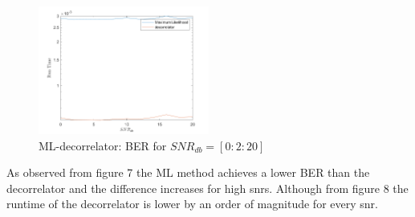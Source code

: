 \documentclass[12pt]{article}
\begin{document}
\begin{enumerate}
\begin{enumerate}
\begin{enumerate}
				\begin{figure}[h!]
					\centering
					\includegraphics[width=0.5\textwidth]{fig8.png}
					\caption{ML-decorrelator: BER for $SNR_{db}=[0:2:20]$}
				\end{figure}
				As observed from figure 7 the ML method achieves a lower BER than the decorrelator and the difference increases for high snrs. Although from figure 8 the runtime of the decorrelator is lower by an order of magnitude for every snr.
			\end{enumerate}
		\end{enumerate}
	\end{enumerate}
	
\end{document}
